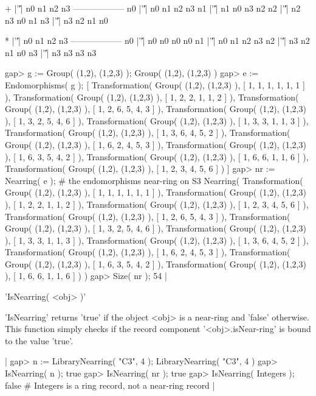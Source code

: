     +  |'\|'| n0 n1 n2 n3 
   ------------------
    n0 |'\|'| n0 n1 n2 n3 
    n1 |'\|'| n1 n0 n3 n2 
    n2 |'\|'| n2 n3 n0 n1 
    n3 |'\|'| n3 n2 n1 n0 

    *  |'\|'| n0 n1 n2 n3 
   ------------------
    n0 |'\|'| n0 n0 n0 n0 
    n1 |'\|'| n0 n1 n2 n3 
    n2 |'\|'| n3 n2 n1 n0 
    n3 |'\|'| n3 n3 n3 n3 

  gap> g := Group( (1,2), (1,2,3) );
  Group( (1,2), (1,2,3) )
  gap> e := Endomorphisms( g );
  [ Transformation( Group( (1,2), (1,2,3) ), [ 1, 1, 1, 1, 1, 1 ] ), 
    Transformation( Group( (1,2), (1,2,3) ), [ 1, 2, 2, 1, 1, 2 ] ), 
    Transformation( Group( (1,2), (1,2,3) ), [ 1, 2, 6, 5, 4, 3 ] ), 
    Transformation( Group( (1,2), (1,2,3) ), [ 1, 3, 2, 5, 4, 6 ] ), 
    Transformation( Group( (1,2), (1,2,3) ), [ 1, 3, 3, 1, 1, 3 ] ), 
    Transformation( Group( (1,2), (1,2,3) ), [ 1, 3, 6, 4, 5, 2 ] ), 
    Transformation( Group( (1,2), (1,2,3) ), [ 1, 6, 2, 4, 5, 3 ] ), 
    Transformation( Group( (1,2), (1,2,3) ), [ 1, 6, 3, 5, 4, 2 ] ), 
    Transformation( Group( (1,2), (1,2,3) ), [ 1, 6, 6, 1, 1, 6 ] ), 
    Transformation( Group( (1,2), (1,2,3) ), [ 1, 2, 3, 4, 5, 6 ] ) ]
  gap> nr := Nearring( e );     # the endomorphisms near-ring on S3
  Nearring( Transformation( Group( (1,2), (1,2,3) ), [ 1, 1, 1, 1, 1, 1 
   ] ), Transformation( Group( (1,2), (1,2,3) ), [ 1, 2, 2, 1, 1, 2 
   ] ), Transformation( Group( (1,2), (1,2,3) ), [ 1, 2, 3, 4, 5, 6 
   ] ), Transformation( Group( (1,2), (1,2,3) ), [ 1, 2, 6, 5, 4, 3 
   ] ), Transformation( Group( (1,2), (1,2,3) ), [ 1, 3, 2, 5, 4, 6 
   ] ), Transformation( Group( (1,2), (1,2,3) ), [ 1, 3, 3, 1, 1, 3 
   ] ), Transformation( Group( (1,2), (1,2,3) ), [ 1, 3, 6, 4, 5, 2 
   ] ), Transformation( Group( (1,2), (1,2,3) ), [ 1, 6, 2, 4, 5, 3 
   ] ), Transformation( Group( (1,2), (1,2,3) ), [ 1, 6, 3, 5, 4, 2 
   ] ), Transformation( Group( (1,2), (1,2,3) ), [ 1, 6, 6, 1, 1, 6 ] ) ) 
  gap> Size( nr );
  54
|

   
'IsNearring( <obj> )'  

'IsNearring' returns 'true' if the object <obj> is a near-ring 
and 'false' otherwise. This function simply checks if the record 
component '<obj>.isNear-ring' is bound to the value 'true'.

|  gap> n := LibraryNearring( "C3", 4 );
  LibraryNearring( "C3", 4 )
  gap> IsNearring( n );
  true
  gap> IsNearring( nr );
  true
  gap> IsNearring( Integers );
  false           # Integers is a ring record, not a near-ring record
|

